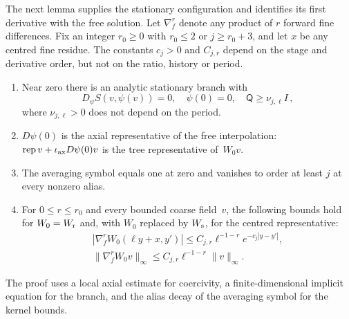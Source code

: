 The next lemma supplies the stationary configuration and identifies its first derivative with the free solution. Let $\nabla_f^r$ denote any product of $r$ forward fine differences. Fix an integer $r_0\ge0$ with $r_0\le2$ or $j\ge r_0+3$, and let $x$ be any centred fine residue. The constants $c_j>0$ and $C_{j,r}$ depend on the stage and derivative order, but not on the ratio, history or period.
\begin{lemma}\label{lem:B3}
\begin{enumerate}[label=(\roman*)]
\item Near zero there is an analytic stationary branch with
\begin{equation*}
D_\psi S(v,\psi(v))=0,\quad \psi(0)=0,\quad \mathsf Q\ge\nu_{j,\ell} I\,,
\end{equation*}
where $\nu_{j,\ell}>0$ does not depend on the period.
\item $D\psi(0)$ is the axial representative of the free interpolation: $\operatorname{rep}v+\iota_{\rm ax}D\psi(0)v$ is the tree representative of~$W_0v$.
\item The averaging symbol equals one at zero and vanishes to order at least $j$ at every nonzero alias.
\item For $0\le r\le r_0$ and every bounded coarse field~$v$, the following bounds hold for $W_0=W_{\rm r}$ and, with $W_0$ replaced by $W_{\rm s}$, for the centred representative:
\begin{gather*}
|\nabla_f^rW_0(\ell y+x,y')|\le C_{j,r}\ell^{-1-r}e^{-c_j|y-y'|},\\
\|\nabla_f^rW_0v\|_\infty\le C_{j,r}\ell^{-1-r}\|v\|_\infty.
\end{gather*}
\end{enumerate}
\end{lemma}
The proof uses a local axial estimate for coercivity, a finite-dimensional implicit equation for the branch, and the alias decay of the averaging symbol for the kernel bounds.
